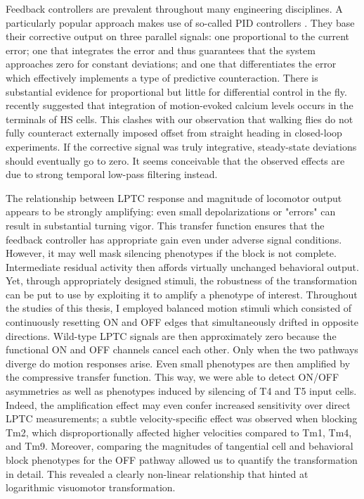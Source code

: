Feedback controllers are prevalent throughout many engineering disciplines. A particularly popular approach makes use of so-called PID controllers \citep{Astrom:2008aa}. They base their corrective output on three parallel signals: one proportional to the current error; one that integrates the error and thus guarantees that the system approaches zero for constant deviations; and one that differentiates the error which effectively implements a type of predictive counteraction. There is substantial evidence for proportional but little for differential control in the fly. \citet{Schnell:2014hs} recently suggested that integration of motion-evoked calcium levels occurs in the terminals of HS cells. This clashes with our observation that walking flies do not fully counteract externally imposed offset from straight heading in closed-loop experiments. If the corrective signal was truly integrative, steady-state deviations should eventually go to zero. It seems conceivable that the observed effects are due to strong temporal low-pass filtering instead.


The relationship between LPTC response and magnitude of locomotor output appears to be strongly amplifying: even small depolarizations or "errors" can result in substantial turning vigor. This transfer function ensures that the feedback controller has appropriate gain even under adverse signal conditions. However, it may well mask silencing phenotypes if the block is not complete. Intermediate residual activity then affords virtually unchanged behavioral output. Yet, through appropriately designed stimuli, the robustness of the transformation can be put to use by exploiting it to amplify a phenotype of interest. Throughout the studies of this thesis, I employed balanced motion stimuli \citep[modified from][]{Clark:2011gw} which consisted of continuously resetting ON and OFF edges that simultaneously drifted in opposite directions. Wild-type LPTC signals are then approximately zero because the functional ON and OFF channels cancel each other. Only when the two pathways diverge do motion responses arise. Even small phenotypes are then amplified by the compressive transfer function. This way, we were able to detect ON/OFF asymmetries as well as phenotypes induced by silencing of T4 and T5 input cells. Indeed, the amplification effect may even confer increased sensitivity over direct LPTC measurements; a subtle velocity-specific effect was observed when blocking Tm2, which disproportionally affected higher velocities compared to Tm1, Tm4, and Tm9. Moreover, comparing the magnitudes of tangential cell and behavioral block phenotypes for the OFF pathway allowed us to quantify the transformation in detail. This revealed a clearly non-linear relationship that hinted at logarithmic visuomotor transformation.

